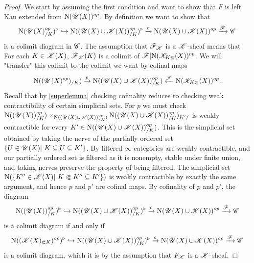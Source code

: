 \documentclass[../../thesis.tex]{subfiles}
\begin{document}
\begin{proof}
    We start by assuming the first condition and want to show that $F$ is left Kan extended from $\mathrm{N}({\mathscr{U}}(X))^{op}$.
    By definition we want to show that
    \[
        \mathrm{N}(\mathscr{U}(X)_{/K}^{op})^{\triangleright} \hookrightarrow \mathrm{N}((\mathscr{U}(X)\cup \mathscr{K}(X))_{/K}^{op})^{\triangleright} \xrightarrow{c}\mathrm{N}(\mathscr{U}(X) \cup \mathscr{K}(X))^{op}\xrightarrow{\mathscr{F}}\mathscr{C}
    \]
    is a colimit diagram in $\mathscr{C}$.
    The assumption that $\mathscr{F}_{\mathscr{K}}$ is a $\mathscr{K}$-sheaf means that For each $K\in \mathscr{K}(X)$, $\mathscr{F}_{\mathscr{K}}(K)$ is a colimit of $\mathscr{F}|\mathrm{N}(\mathscr{K}_{K\Subset}(X))^{op}$.
    We will "transfer" this colimit to the colimit we want by cofinal maps
    \[
        \mathrm{N}((\mathscr{U}(X)^{op})_{/K}) \xrightarrow{p} \mathrm{N}((\mathscr{U}(X)\cup \mathscr{K}(X))_{/K}^{op}) \xleftarrow{p'}\mathrm{N}(\mathscr{K}_{K\Subset}(X))^{op}.
    \]
    Recall that by \ref{superlemma} checking cofinality reduces to checking weak contractibility of certain simplicial sets.
    For $p$ we must check $\mathrm{N}((\mathscr{U}(X))^{op}_{/K}) \times_{\mathrm{N}((\mathscr{U}(X)\cup \mathscr{K}(X))_{/K}^{op})} \mathrm{N}((\mathscr{U}(X)\cup \mathscr{K}(X))_{/K}^{op})_{K'/}$ is weakly contractible for every $K' \in \mathrm{N}((\mathscr{U}(X)\cup \mathscr{K}(X))_{/K}^{op})$.
    This is the simplicial set obtained by taking the nerve of the partially ordered set $\{U \in \Open(X) | K\subseteq U \subseteq K'\}$.
    By \cite[Lemma 5.3.1.20]{HTT} filtered $\infty$-categories are weakly contractible, and our partially ordered set is filtered as it is nonempty, stable under finite union, and taking nerves preserve the property of being filtered.
    The simplicial set $\Nerve(\{K'' \in \K(X) | K \Subset K'' \subseteq K'\})$ is weakly contractible by exactly the same argument, and hence $p$ and $p'$ are cofinal maps.
    By cofinality of $p$ and $p'$, the diagram
    \[
        \mathrm{N}((\mathscr{U}(X))^{op}_{/K})^{\triangleright} \hookrightarrow \mathrm{N}((\mathscr{U}(X)\cup \mathscr{K}(X))_{/K}^{op})^{\triangleright} \xrightarrow{c}\mathrm{N}(\mathscr{U}(X) \cup \mathscr{K}(X))^{op}\xrightarrow{\mathscr{F}}\mathscr{C}
    \]
    is a colimit diagram if and only if
    \[
        \mathrm{N}((\mathscr{K}(X)_{\Subset K})^{op})^{\triangleright} \hookrightarrow \mathrm{N}((\mathscr{U}(X)\cup \mathscr{K}(X))_{/K}^{op})^{\triangleright} \xrightarrow{c}\mathrm{N}(\mathscr{U}(X) \cup \mathscr{K}(X))^{op}\xrightarrow{\mathscr{F}}\mathscr{C}
    \]
    is a colimit diagram, which it is by the assumption that $F_{\mathscr{K}}$ is a $\mathscr{K}$-sheaf.

\end{proof}
\end{document}
